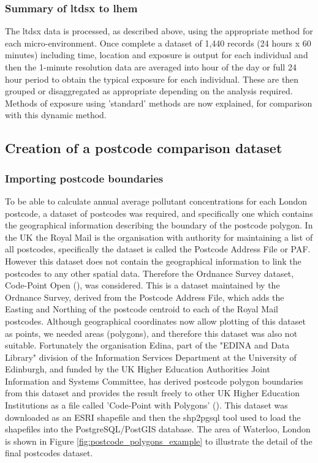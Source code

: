         \subsubsection{Summary of \gls{ltdsx} to \gls{lhem}}
        \label{sec:summary_of_ltdsx_to_lhem}

The \gls{ltdsx} data is processed, as described above, using the appropriate method for each micro-environment. Once complete a dataset of 1,440 records (24 hours x 60 minutes) including time, location and exposure is output for each individual and then the 1-minute resolution data are averaged into hour of the day or full 24 hour period to obtain the typical exposure for each individual. These are then grouped or disaggregated as appropriate depending on the analysis required. Methods of exposure using 'standard' methods are now explained, for comparison with this dynamic method.

    \subsection{Creation of a postcode comparison dataset}
    \label{sec:creating_postcode_dataset}

        \subsubsection{Importing postcode boundaries}
        \label{sec:import_postcode_boundaries}

To be able to calculate annual average pollutant concentrations for each London postcode, a dataset of postcodes was required, and specifically one which contains the geographical information describing the boundary of the postcode polygon. In the UK the Royal Mail is the organisation with authority for maintaining a list of all postcodes, specifically the dataset is called the Postcode Address File or PAF. However this dataset does not contain the geographical information to link the postcodes to any other spatial data. Therefore the Ordnance Survey dataset, Code-Point Open (\cite{OrdnanceSurvey2015a}), was considered. This is a dataset maintained by the Ordnance Survey, derived from the Postcode Address File, which adds the Easting and Northing of the postcode centroid to each of the Royal Mail postcodes. Although geographical coordinates now allow plotting of this dataset as points, we needed areas (polygons), and therefore this dataset was also not suitable. Fortunately the organisation Edina, part of the "EDINA and Data Library" division of the Information Services Department at the University of Edinburgh, and funded by the UK Higher Education Authorities Joint Information and Systems Committee, has derived postcode polygon boundaries from this dataset and provides the result freely to other UK Higher Education Institutions as a file called 'Code-Point with Polygons' (\cite{OrdnanceSurvey2015}). This dataset was downloaded as an ESRI shapefile and then the shp2pgsql tool used to load the shapefiles into the PostgreSQL/PostGIS database. The area of Waterloo, London is shown in Figure \ref{fig:postcode_polygons_example} to illustrate the detail of the final postcodes dataset.

